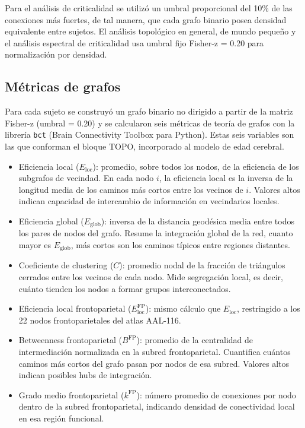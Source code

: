 \documentclass[12pt,a4paper]{article}
\begin{document}
Para el análisis de criticalidad se utilizó un umbral proporcional del 10\% de las conexiones más fuertes, de tal manera, que cada grafo
binario posea densidad equivalente entre sujetos. El análisis topológico en general, de mundo pequeño y el análisis espectral de criticalidad usa umbral fijo Fisher-z = 0.20 para normalización por densidad.

\subsection{Métricas de grafos}
\label{sec:topo}

Para cada sujeto se construyó un grafo binario no dirigido a partir de la matriz Fisher-z (umbral = 0.20) y se calcularon seis métricas de teoría de grafos con la librería \texttt{bct} (Brain Connectivity Toolbox para Python)\cite{rubinov2010}. Estas seis variables son las que conforman el bloque TOPO, incorporado al modelo de edad cerebral.

\begin{itemize}
  \item Eficiencia local ($E_{\text{loc}}$): promedio, sobre todos los nodos, de la eficiencia
        de los subgrafos de vecindad. En cada nodo $i$, la eficiencia local es la inversa de la
        longitud media de los caminos más cortos entre los vecinos de $i$. Valores altos indican
        capacidad de intercambio de información en vecindarios locales.
  \item Eficiencia global ($E_{\text{glob}}$): inversa de la distancia geodésica media entre
        todos los pares de nodos del grafo. Resume la integración global de la red, cuanto mayor
        es $E_{\text{glob}}$, más cortos son los caminos típicos entre regiones distantes.
  \item Coeficiente de clustering ($C$): promedio nodal de la fracción de triángulos cerrados
        entre los vecinos de cada nodo. Mide segregación local, es decir, cuánto tienden los nodos a
        formar grupos interconectados.
  \item Eficiencia local frontoparietal ($E_{\text{loc}}^{\text{FP}}$): mismo cálculo que
        $E_{\text{loc}}$, restringido a los 22 nodos frontoparietales del atlas AAL-116\cite{tzourio2002}.
  \item Betweenness frontoparietal ($B^{\text{FP}}$): promedio de la centralidad de
        intermediación normalizada en la subred frontoparietal. Cuantifica cuántos caminos
        más cortos del grafo pasan por nodos de esa subred. Valores altos indican posibles
        hubs de integración.
  \item Grado medio frontoparietal ($k^{\text{FP}}$): número promedio de conexiones por nodo
        dentro de la subred frontoparietal, indicando densidad de conectividad local en esa
        región funcional.
\end{itemize}
\end{document}
